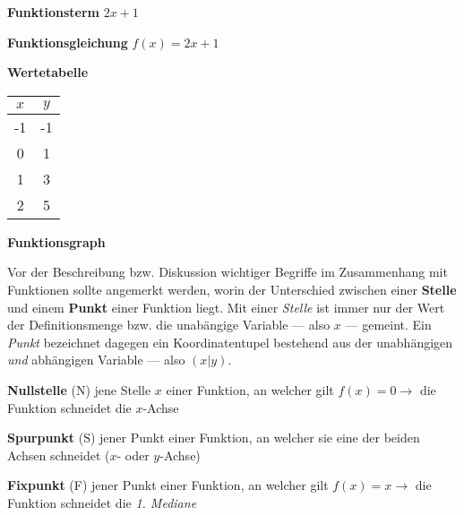\begin{multicols}{2}

\textbf{Funktionsterm}  $2x + 1$

\textbf{Funktionsgleichung}  $f(x) = 2x + 1$

\textbf{Wertetabelle} 
\begin{tabular}{c | c}

	$x$ & $y$
	\\ \hline
	-1 & -1
	\\
	0 & 1
	\\
	1 & 3
	\\
	2 & 5

\end{tabular}


\begin{center}\textbf{Funktionsgraph}\end{center}

\end{multicols}


Vor der Beschreibung bzw. Diskussion wichtiger Begriffe im Zusammenhang mit Funktionen sollte angemerkt werden, worin der Unterschied zwischen einer \textbf{Stelle} und einem \textbf{Punkt} einer Funktion liegt. Mit einer \emph{Stelle} ist immer nur der Wert der Definitionsmenge bzw. die unab\"{a}ngige Variable --- also $x$ --- gemeint. Ein \emph{Punkt} bezeichnet dagegen ein Koordinatentupel bestehend aus der unabh\"{a}ngigen \emph{und} abh\"{a}ngigen Variable --- also $(x| y)$.

\textbf{Nullstelle} (N)  jene Stelle $x$ einer Funktion, an welcher gilt $f(x) = 0 \rightarrow$ die Funktion schneidet die $x$-Achse

\textbf{Spurpunkt} (S)  jener Punkt einer Funktion, an welcher sie eine der beiden Achsen schneidet ($x$- oder $y$-Achse)

\textbf{Fixpunkt} (F)  jener Punkt einer Funktion, an welcher gilt $f(x) = x \rightarrow$ die Funktion schneidet die \emph{1. Mediane}

